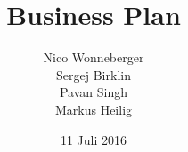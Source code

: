 \title{Business Plan}
\author{Nico Wonneberger \\ Sergej Birklin \\ Pavan Singh \\ Markus Heilig}
\date{11 Juli 2016}